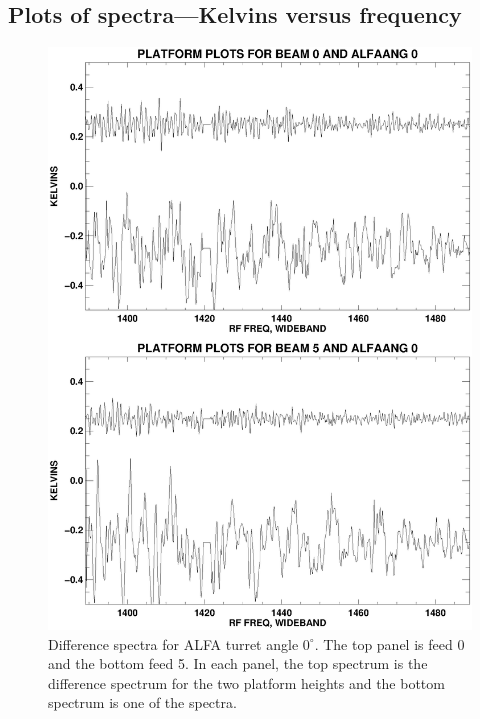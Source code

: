\documentclass[psfig,preprint]{aastex}
\begin{document}
\subsection{Plots of spectra---Kelvins versus frequency}
\begin{figure}[!p]
\begin{center}
\includegraphics[width=6in]{platform11.ps}   
\end{center}
\caption{Difference spectra for ALFA turret angle $0^\circ$. 
The top panel is feed 0 and the bottom feed 5. In each panel,
the top spectrum is the difference spectrum for the two platform heights
and the bottom spectrum is one of the spectra. \label{platform11}}
\end{figure}
\end{document}
